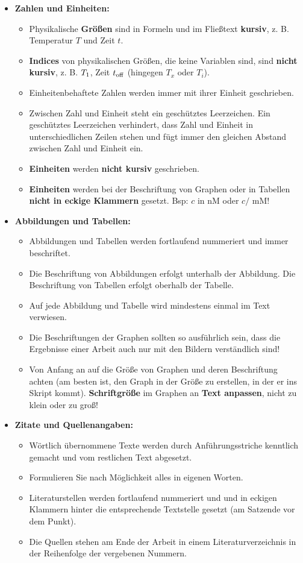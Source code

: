 \begin{itemize}
\item \textbf{Zahlen und Einheiten:}\begin{itemize}
	\item Physikalische \textbf{Größen} sind in Formeln und im Fließtext \textbf{kursiv}, z. B. Temperatur $T$ und Zeit $t$. 
	\item \textbf{Indices} von physikalischen Größen, die keine Variablen sind, sind \textbf{nicht kursiv}, z. B. $T_{\rm{1}}$, Zeit $t_{\rm{off}}$ (hingegen $T_x$ oder $T_i$). 
	\item Einheitenbehaftete Zahlen werden immer mit ihrer Einheit geschrieben.
	\item Zwischen Zahl und Einheit steht ein geschütztes Leerzeichen. Ein geschütztes Leerzeichen verhindert, dass Zahl und Einheit in unterschiedlichen Zeilen stehen und fügt immer den gleichen Abstand zwischen Zahl und Einheit ein.
	\item \textbf{Einheiten} werden \textbf{nicht kursiv} geschrieben. 
	\item \textbf{Einheiten} werden bei der Beschriftung von Graphen oder in Tabellen \textbf{nicht in eckige Klammern} gesetzt. Bsp: $c$ in nM oder $c /$ mM!
	\end{itemize}
\item \textbf{Abbildungen und Tabellen:}\begin{itemize}
	\item Abbildungen und Tabellen werden fortlaufend nummeriert und immer beschriftet. 
	\item Die Beschriftung von Abbildungen erfolgt unterhalb der Abbildung. Die Beschriftung von Tabellen erfolgt oberhalb der Tabelle.
	\item Auf jede Abbildung und Tabelle wird mindestens einmal im Text verwiesen.
	\item Die Beschriftungen der Graphen sollten so ausführlich sein, dass die Ergebnisse einer Arbeit auch nur mit den Bildern verständlich sind!
	\item Von Anfang an auf die Größe von Graphen und deren Beschriftung achten (am besten ist, den Graph in der Größe zu erstellen, in der er ins Skript kommt). \textbf{Schriftgröße} im Graphen an \textbf{Text anpassen}, nicht zu klein oder zu groß!
	\end{itemize}
\item \textbf{Zitate und Quellenangaben:}\begin{itemize}
	\item Wörtlich übernommene Texte werden durch Anführungsstriche kenntlich gemacht und vom restlichen Text abgesetzt.
	\item Formulieren Sie nach Möglichkeit alles in eigenen Worten.
	\item Literaturstellen werden fortlaufend nummeriert und und in eckigen Klammern hinter die entsprechende Textstelle gesetzt (am Satzende vor dem Punkt). 
	\item Die Quellen stehen am Ende der Arbeit in einem Literaturverzeichnis in der Reihenfolge der vergebenen Nummern.
	\end{itemize}
\end{itemize}

